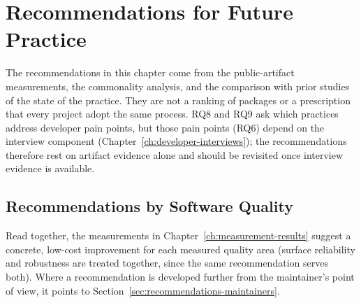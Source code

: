 \chapter{Recommendations for Future Practice}
\label{ch:recommendations}

The recommendations in this chapter come from the public-artifact measurements, the commonality analysis, and the comparison with prior studies of the state of the practice. They are not a ranking of packages or a prescription that every project adopt the same process. RQ8 and RQ9 ask which practices address developer pain points, but those pain points (RQ6) depend on the interview component (Chapter~\ref{ch:developer-interviews}); the recommendations therefore rest on artifact evidence alone and should be revisited once interview evidence is available.

\section{Recommendations by Software Quality}
\label{sec:recommendations-by-quality}

Read together, the measurements in Chapter~\ref{ch:measurement-results} suggest a concrete, low-cost improvement for each measured quality area (surface reliability and robustness are treated together, since the same recommendation serves both). Where a recommendation is developed further from the maintainer's point of view, it points to Section~\ref{sec:recommendations-maintainers}.

